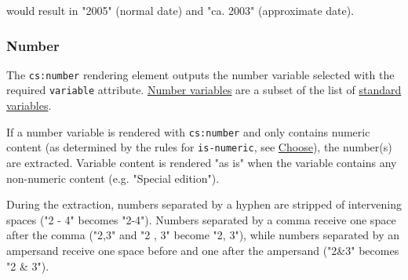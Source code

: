 \begin{Shaded}
\begin{Highlighting}[]
\NormalTok{\textless{}}\NormalTok{\textgreater{}}
\NormalTok{  \textless{}}\NormalTok{\textgreater{}}
\NormalTok{    \textless{}}\NormalTok{\textgreater{}}
\NormalTok{      \textless{}}\NormalTok{\textgreater{}}
\NormalTok{        \textless{}}\NormalTok{\textgreater{}}
\NormalTok{          \textless{}}\NormalTok{/\textgreater{}}
\NormalTok{        \textless{}/}\NormalTok{\textgreater{}}
\NormalTok{      \textless{}/}\NormalTok{\textgreater{}}
\NormalTok{      \textless{}}\NormalTok{\textgreater{}}
\NormalTok{        \textless{}}\NormalTok{/\textgreater{}}
\NormalTok{      \textless{}/}\NormalTok{\textgreater{}}
\NormalTok{    \textless{}/}\NormalTok{\textgreater{}}
\NormalTok{  \textless{}/}\NormalTok{\textgreater{}}
\NormalTok{\textless{}/}\NormalTok{\textgreater{}}
\end{Highlighting}
\end{Shaded}

would result in "2005" (normal date) and "ca. 2003" (approximate date).

\hypertarget{number}{%
\subsubsection{Number}\label{number}}

The \texttt{cs:number} rendering element outputs the number variable
selected with the required \texttt{variable} attribute.
\protect\hyperlink{number-variables}{Number variables} are a subset of
the list of \protect\hyperlink{standard-variables}{standard variables}.

If a number variable is rendered with \texttt{cs:number} and only
contains numeric content (as determined by the rules for
\texttt{is-numeric}, see \protect\hyperlink{choose}{Choose}), the
number(s) are extracted. Variable content is rendered "as is" when the
variable contains any non-numeric content (e.g. "Special edition").

During the extraction, numbers separated by a hyphen are stripped of
intervening spaces ("2 - 4" becomes "2-4"). Numbers separated by a comma
receive one space after the comma ("2,3" and "2 , 3" become "2, 3"),
while numbers separated by an ampersand receive one space before and one
after the ampersand ("2\&3" becomes "2 \& 3").

